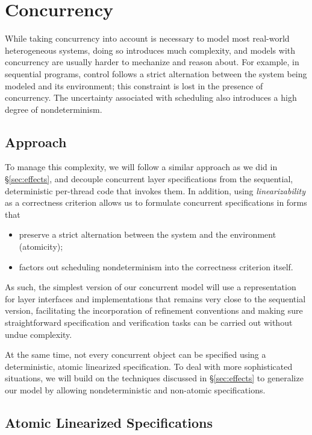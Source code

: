 \section{Concurrency}
\label{sec:concurrency}

While taking concurrency into account is necessary
to model most real-world heterogeneous systems,
doing so introduces much complexity, and
models with concurrency are usually
harder to mechanize and reason about.
For example, in sequential programs,
control follows a strict alternation
between the system being modeled and its environment;
this constraint is lost in the presence of concurrency.
The uncertainty associated with scheduling also
introduces a high degree of nondeterminism.

\subsection{Approach}

To manage this complexity,
we will follow a similar approach as we did in \S\ref{sec:effects},
and decouple concurrent layer specifications from
the sequential, deterministic per-thread code that invokes them.
In addition,
using \emph{linearizability} as a correctness criterion
allows us to formulate concurrent specifications in forms that
\begin{itemize}
  \item preserve a strict alternation between
    the system and the environment (atomicity);
  \item factors out scheduling nondeterminism
    into the correctness criterion itself.
\end{itemize}
As such,
the simplest version of our concurrent model
will use a representation for
layer interfaces and implementations
that remains very close to the sequential version,
facilitating the incorporation of refinement conventions and
making sure straightforward specification and verification tasks
can be carried out without undue complexity.

At the same time,
not every concurrent object can be specified
using a deterministic, atomic linearized specification.
To deal with more sophisticated situations,
we will build on the techniques discussed in \S\ref{sec:effects}
to generalize our model by allowing
nondeterministic and non-atomic specifications.

\subsection{Atomic Linearized Specifications}

